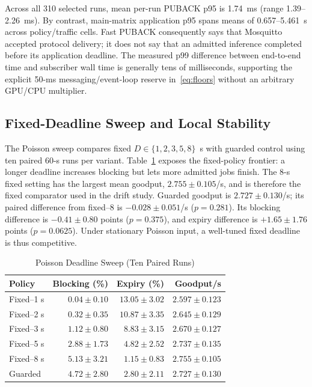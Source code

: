 Across all 310 selected runs, mean per-run PUBACK p95 is 1.74~ms (range 1.39--2.26~ms). By contrast, main-matrix application p95 spans means of 0.657--5.461~s across policy/traffic cells. Fast PUBACK consequently says that Mosquitto accepted protocol delivery; it does not say that an admitted inference completed before its application deadline. The measured p99 difference between end-to-end time and subscriber wall time is generally tens of milliseconds, supporting the explicit 50-ms messaging/event-loop reserve in~\eqref{eq:floors} without an arbitrary GPU/CPU multiplier.

\subsection{Fixed-Deadline Sweep and Local Stability}

The Poisson sweep compares fixed $D\in\{1,2,3,5,8\}$~s with guarded control using ten paired 60-s runs per variant. Table~\ref{tab:deadline-sweep} exposes the fixed-policy frontier: a longer deadline increases blocking but lets more admitted jobs finish. The 8-s fixed setting has the largest mean goodput, $2.755\pm0.105$/s, and is therefore the fixed comparator used in the drift study. Guarded goodput is $2.727\pm0.130$/s; its paired difference from fixed--8 is $-0.028\pm0.051$/s ($p=0.281$). Its blocking difference is $-0.41\pm0.80$ points ($p=0.375$), and expiry difference is $+1.65\pm1.76$ points ($p=0.0625$). Under stationary Poisson input, a well-tuned fixed deadline is thus competitive.

\begin{table}[t]
\centering
\caption{Poisson Deadline Sweep (Ten Paired Runs)}
\label{tab:deadline-sweep}
\small
\begin{tabular}{@{}lrrr@{}}
\toprule
Policy & Blocking (\%) & Expiry (\%) & Goodput/s \\
\midrule
Fixed--1 s & $0.04\pm0.10$ & $13.05\pm3.02$ & $2.597\pm0.123$ \\
Fixed--2 s & $0.32\pm0.35$ & $10.87\pm3.35$ & $2.645\pm0.129$ \\
Fixed--3 s & $1.12\pm0.80$ & $8.83\pm3.15$ & $2.670\pm0.127$ \\
Fixed--5 s & $2.88\pm1.73$ & $4.82\pm2.52$ & $2.737\pm0.135$ \\
Fixed--8 s & $5.13\pm3.21$ & $1.15\pm0.83$ & $2.755\pm0.105$ \\
Guarded & $4.72\pm2.80$ & $2.80\pm2.11$ & $2.727\pm0.130$ \\
\bottomrule
\end{tabular}
\end{table}

